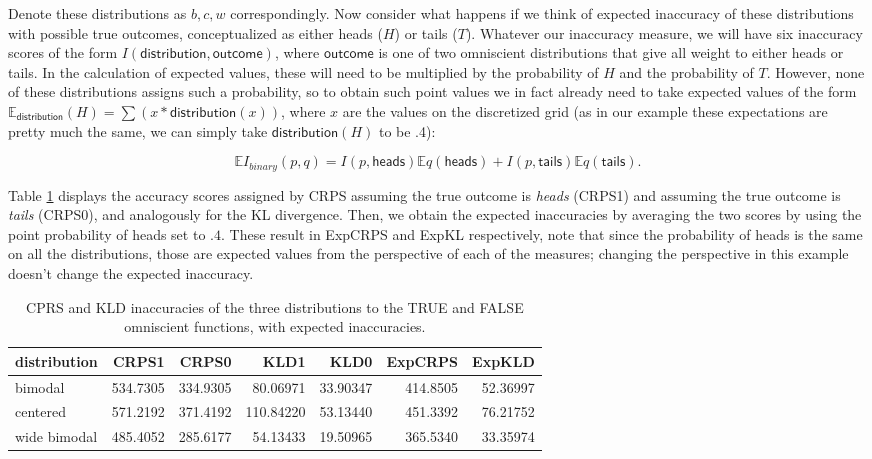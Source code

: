 \documentclass[
  letterpaper,
  DIV=11,
  numbers=noendperiod]{scrartcl}
\begin{document}
Denote these distributions as \(b, c, w\) correspondingly. Now consider
what happens if we think of expected inaccuracy of these distributions
with possible true outcomes, conceptualized as either heads (\(H\)) or
tails (\(T\)). Whatever our inaccuracy measure, we will have six
inaccuracy scores of the form
\(I(\mathsf{distribution}, \mathsf{outcome})\), where
\(\mathsf{outcome}\) is one of two omniscient distributions that give
all weight to either heads or tails. In the calculation of expected
values, these will need to be multiplied by the probability of \(H\) and
the probability of \(T\). However, none of these distributions assigns
such a probability, so to obtain such point values we in fact already
need to take expected values of the form
\(\mathbb{E}_{\mathsf{distribution}}(H) = \sum (x * \mathsf{distribution}(x))\),
where \(x\) are the values on the discretized grid (as in our example
these expectations are pretty much the same, we can simply take
\(\mathsf{distribution}(H)\) to be .4):

\[\mathbb{E}I_{binary}(p,q) = I(p,\mathsf{heads}) \mathbb{E}q(\mathsf{heads}) + I(p,\mathsf{tails}) \mathbb{E}q(\mathsf{tails}).\]

\noindent  Table \ref{tbl:comp1} displays the accuracy scores assigned
by CRPS assuming the true outcome is \emph{heads} (CRPS1) and assuming
the true outcome is \emph{tails} (CRPS0), and analogously for the KL
divergence. Then, we obtain the expected inaccuracies by averaging the
two scores by using the point probability of heads set to \(.4\). These
result in ExpCRPS and ExpKL respectively, note that since the
probability of heads is the same on all the distributions, those are
expected values from the perspective of each of the measures; changing
the perspective in this example doesn't change the expected inaccuracy.

\begin{table}[H]
\centering
\begin{tabular}{lrrrrrr}
\toprule
distribution & CRPS1 & CRPS0 & KLD1 & KLD0 & ExpCRPS & ExpKLD\\
\midrule
bimodal & 534.7305 & 334.9305 & 80.06971 & 33.90347 & 414.8505 & 52.36997\\
centered & 571.2192 & 371.4192 & 110.84220 & 53.13440 & 451.3392 & 76.21752\\
wide bimodal & 485.4052 & 285.6177 & 54.13433 & 19.50965 & 365.5340 & 33.35974\\
\bottomrule
\end{tabular}
\caption{CPRS and KLD inaccuracies of the three distributions to the TRUE and FALSE omniscient functions, with expected inaccuracies.}
\label{tbl:comp1}
\end{table}
\end{document}
